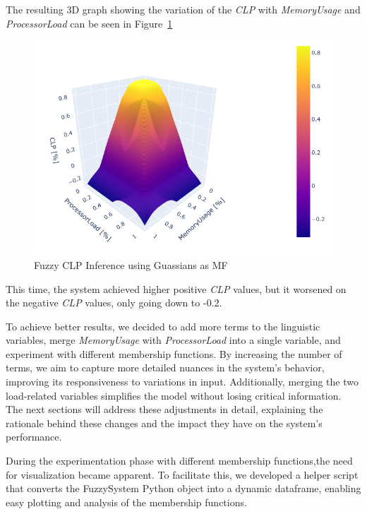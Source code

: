 \documentclass[11pt]{report}
\begin{document}
\vspace{10mm}

The resulting 3D graph showing the variation of the \textit{CLP} with \textit{MemoryUsage} and \textit{ProcessorLoad} can be seen in Figure~\ref{fig:3d_gaussian}

\begin{figure}[H]
    \centering
\includegraphics[scale = 0.8]{../images/3d_guassian}
\caption{Fuzzy CLP Inference using Guassians as MF}
\label{fig:3d_gaussian}
\end{figure}

\vspace{10mm}


This time, the system achieved higher positive \textit{CLP} values, but it worsened on the negative \textit{CLP} values, only going down to -0.2.


To achieve better results, we decided to add more terms to the linguistic variables, merge \textit{MemoryUsage} with \textit{ProcessorLoad} into a single variable, and experiment with different membership functions. By increasing the number of terms, we aim to capture more detailed nuances in the system's behavior, improving its responsiveness to variations in input. Additionally, merging the two load-related variables simplifies the model without losing critical information. The next sections will address these adjustments in detail, explaining the rationale behind these changes and the impact they have on the system's performance.


During the experimentation phase with different membership functions,the need for visualization became apparent.
To facilitate this, we developed a helper script  that converts the
FuzzySystem Python object into a dynamic dataframe, enabling easy plotting and analysis of the membership functions.
\end{document}

